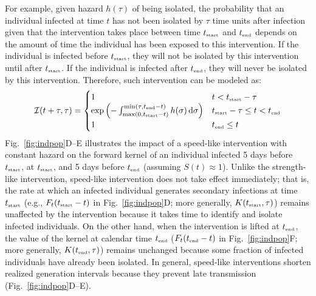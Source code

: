 \documentclass[12pt]{article}
\newcommand{\fref}[1]{Fig.~\ref{fig:#1}}
\newcommand{\tsub}[2]{#1_{{\textrm{\tiny #2}}}}
\newcommand{\dd}[1]{\ensuremath{\, \mathrm{d}#1}}
\newcommand{\tstart}{\ensuremath{\tsub{t}{start}}\xspace}
\newcommand{\tend}{\ensuremath{\tsub{t}{end}}\xspace}
\newcommand{\II}{\ensuremath{\mathcal I}}
\begin{document}
For example, given hazard $h(\tau)$ of being isolated, the probability that an individual infected at time $t$ has not been isolated by $\tau$ time units after infection given that the intervention takes place between time \tstart and \tend depends on the amount of time the individual has been exposed to this intervention.
If the individual is infected before $\tstart$, they will not be isolated by this intervention until after $\tstart$.
If the individual is infected after $\tend$, they will never be isolated by this intervention.
Therefore, such intervention can be modeled as:
\begin{equation}
\II(t+\tau, \tau) = \begin{cases}
1 & t < \tstart-\tau \\
\exp\left(- \int_{\max(0, \tstart - t)}^{\min(\tau, \tend-t)} h(\sigma)\dd{\sigma} \right) & \tstart-\tau \leq t < \tend \\
1 & \tend \leq t
\end{cases}
\end{equation}
\fref{indpop}D--E illustrates the impact of a speed-like intervention with constant hazard on the forward kernel of an individual infected 5 days before $\tstart$, at $\tstart$, and 5 days before $\tend$ (assuming $S(t) \approx 1$).
Unlike the strength-like intervention, speed-like intervention does not take effect immediately;
that is, the rate at which an infected individual generates secondary infections at time $\tstart$ (e.g., $F_t(\tstart-t)$ in \fref{indpop}D; more generally, $K(\tstart, \tau)$) remains unaffected by the intervention because it takes time to identify and isolate infected individuals.
On the other hand, when the intervention is lifted at $\tend$, the value of the kernel at calendar time $\tend$ ($F_t(\tend-t)$ in \fref{indpop}F; more generally, $K(\tend, \tau)$) remains unchanged because some fraction of infected individuals have already been isolated.
In general, speed-like interventions shorten realized generation intervals because they prevent late transmission (\fref{indpop}D--E).
\end{document}
